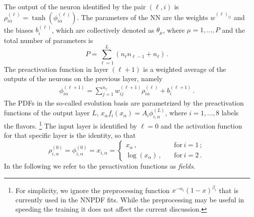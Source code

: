The output of the neuron identified by the pair $(\ell,i)$ is
$\rho^{(\ell)}_{i\alpha} = \tanh\left(\phi^{(\ell)}_{i\alpha}\right)$.
The parameters of the NN are the weights $w^{(\ell)_{ij}}$ and the biases $b^{(\ell)}_i$, which are
collectively denoted as $\theta_\mu$, where $\mu = 1, \ldots, P$ and the total number of parameters
is
\begin{equation}
    \label{eq:TotPar}
    P = \sum_{\ell=1}^{L} \left(n_{\ell} n_{\ell-1} + n_\ell\right)\, .
\end{equation}
The preactivation function in layer $(\ell+1)$ is a weighted average of the outputs of the neurons on 
the previous layer, namely
\begin{align}
    \label{eq:RecursionNN}
    \phi^{(\ell+1)}_{i\alpha} = \sum_{j=1}^{n_\ell} w^{(\ell+1)}_{ij} \rho^{(\ell)}_{i\alpha} + b^{(\ell+1)}_{i}\, .
\end{align}
The PDFs in the
so-called evolution basis are parametrized by the preactivation functions of the output layer $L$,
$x_\alpha f_i(x_\alpha)=A_i \phi^{(L)}_{i,\alpha}$, where $i=1, \ldots, 8$ labels the flavors.
\footnote{For simplicity, we ignore the preprocessing function $x^{-\alpha_i} (1-x)^{\beta_i}$ that
is currently used in the NNPDF fits. While the preprocessing may be useful in speeding the training
it does not affect the current discussion.}
The input layer is identified by $\ell=0$ and the activation
function for that specific layer is the identity, so that
\begin{equation}
    \label{eq:InitLayerPhi}
    \rho^{(0)}_{i,\alpha} = \phi^{(0)}_{i,\alpha} = x_{i,\alpha} =
    \begin{cases}
        x_\alpha\, , \quad &\text{for}\ i=1\, ;\\
        \log\left(x_\alpha\right)\, , \quad &\text{for}\ i=2\, .
    \end{cases}
\end{equation}
In the following we refer to the preactivation functions as {\em fields}.

